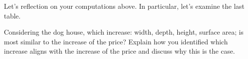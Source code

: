\documentclass[nooutcomes,noauthor,handout]{ximera}
\begin{document}




\begin{question}
  Let's reflection on your computations above. In particular, let's
  examine the last table.
 
 Considering the dog house, which increase: width, depth,
      height, surface area; is most similar to the increase of
      the price? Explain how you identified which increase aligns with
      the increase of the price and discuss why this is the case.
   \end{question}
\end{document}
